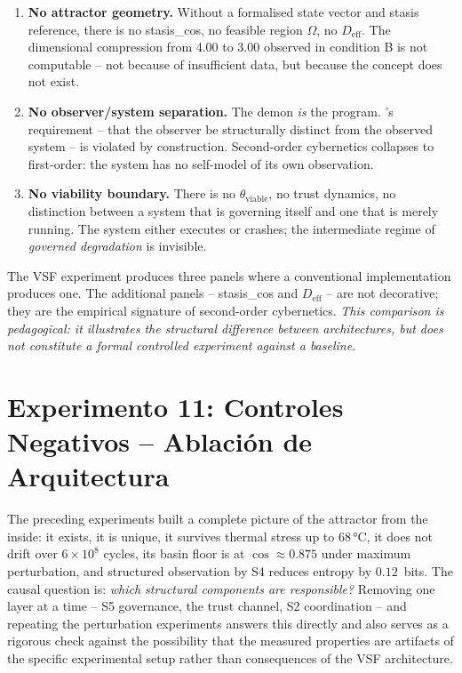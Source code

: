 \documentclass[11pt, a4paper]{article}
\begin{document}
\begin{enumerate}
  \item \textbf{No attractor geometry.}  Without a formalised state vector and
    stasis reference, there is no stasis\_cos, no feasible region $\Omega$,
    no $D_\text{eff}$.  The dimensional compression from 4.00 to 3.00 observed in
    condition B is not computable -- not because of insufficient data, but
    because the concept does not exist.
  \item \textbf{No observer/system separation.}  The demon \emph{is} the
    program.  \citeauthor{vonfoerster1979cybernetics}'s requirement -- that the observer be structurally
    distinct from the observed system -- is violated by construction.
    Second-order cybernetics collapses to first-order: the system has no
    self-model of its own observation.
  \item \textbf{No viability boundary.}  There is no $\theta_\text{viable}$,
    no trust dynamics, no distinction between a system that is governing itself
    and one that is merely running.  The system either executes or crashes;
    the intermediate regime of \emph{governed degradation} is invisible.
\end{enumerate}

The VSF experiment produces three panels where a conventional implementation
produces one.  The additional panels -- stasis\_cos and $D_\text{eff}$ -- are not
decorative; they are the empirical signature of second-order cybernetics.
\textit{This comparison is pedagogical: it illustrates the structural
difference between architectures, but does not constitute a formal
controlled experiment against a baseline.}

\FloatBarrier
\section{Experimento 11: Controles Negativos -- Ablación de Arquitectura}
\label{sec:negcontrols}

The preceding experiments built a complete picture of the attractor from
the inside: it exists, it is unique, it survives thermal stress up to 68\,°C,
it does not drift over $6\times 10^8$ cycles, its basin floor is at
$\cos \approx 0.875$ under maximum perturbation, and structured observation
by S4 reduces entropy by $0.12$~bits.
The causal question is: \emph{which structural components are responsible?}
Removing one layer at a time -- S5 governance, the trust channel, S2
coordination -- and repeating the perturbation experiments answers this
directly and also serves as a rigorous check against the possibility that
the measured properties are artifacts of the specific experimental setup
rather than consequences of the VSF architecture.
\end{document}
